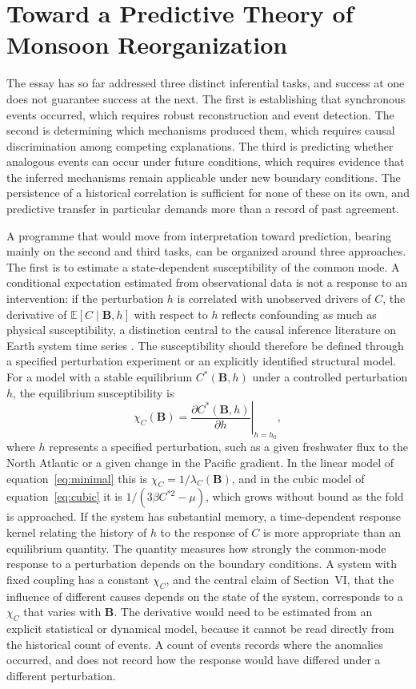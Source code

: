 \documentclass[11pt]{article}
\theoremstyle{definition}
\newcommand{\E}{\mathbb{E}}
\newcommand{\bB}{\mathbf{B}}
\begin{document}
\section{Toward a Predictive Theory of Monsoon Reorganization}

The essay has so far addressed three distinct inferential tasks, and success at one does not guarantee success at the next. The first is establishing that synchronous events occurred, which requires robust reconstruction and event detection. The second is determining which mechanisms produced them, which requires causal discrimination among competing explanations. The third is predicting whether analogous events can occur under future conditions, which requires evidence that the inferred mechanisms remain applicable under new boundary conditions. The persistence of a historical correlation is sufficient for none of these on its own, and predictive transfer in particular demands more than a record of past agreement.

A programme that would move from interpretation toward prediction, bearing mainly on the second and third tasks, can be organized around three approaches. The first is to estimate a state-dependent susceptibility of the common mode. A conditional expectation estimated from observational data is not a response to an intervention: if the perturbation $h$ is correlated with unobserved drivers of $C$, the derivative of $\E[C \mid \bB, h]$ with respect to $h$ reflects confounding as much as physical susceptibility, a distinction central to the causal inference literature on Earth system time series \citep{runge2019}. The susceptibility should therefore be defined through a specified perturbation experiment or an explicitly identified structural model. For a model with a stable equilibrium $C^{*}(\bB, h)$ under a controlled perturbation $h$, the equilibrium susceptibility is
\begin{equation}
\chi_C(\bB) = \left.\frac{\partial C^{*}(\bB, h)}{\partial h}\right|_{h=h_0},
\label{eq:susceptibility}
\end{equation}
where $h$ represents a specified perturbation, such as a given freshwater flux to the North Atlantic or a given change in the Pacific gradient. In the linear model of equation~\eqref{eq:minimal} this is $\chi_C = 1/\lambda_C(\bB)$, and in the cubic model of equation~\eqref{eq:cubic} it is $1/(3\beta C^{*2} - \mu)$, which grows without bound as the fold is approached. If the system has substantial memory, a time-dependent response kernel relating the history of $h$ to the response of $C$ is more appropriate than an equilibrium quantity. The quantity measures how strongly the common-mode response to a perturbation depends on the boundary conditions. A system with fixed coupling has a constant $\chi_C$, and the central claim of Section~VI, that the influence of different causes depends on the state of the system, corresponds to a $\chi_C$ that varies with $\bB$. The derivative would need to be estimated from an explicit statistical or dynamical model, because it cannot be read directly from the historical count of events. A count of events records where the anomalies occurred, and does not record how the response would have differed under a different perturbation.
\end{document}
